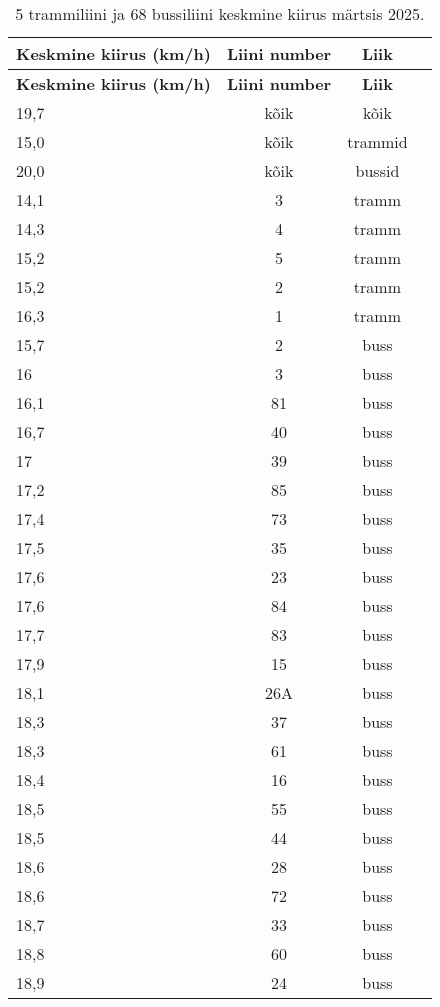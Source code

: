 


\begin{longtable}{|l|c|c|c|}
\caption{5 trammiliini ja  68 bussiliini keskmine kiirus märtsis 2025. }
\label{tab:keskmisedMartsis}\\ \hline
 \textbf{Keskmine kiirus (km/h)}  & \textbf{Liini number}  & \textbf{Liik} \\
\hline
\endfirsthead
\hline
\textbf{Keskmine kiirus (km/h)} & 
\textbf{Liini number} & \textbf{Liik} \\
\hline
\endhead
19,7 & kõik & kõik\\ \hline
15,0 & kõik & trammid\\ \hline
20,0 & kõik & bussid\\ \hline
14,1	&	3	&	tramm	\\ \hline
14,3	&	4	&	tramm	\\ \hline 
15,2	&	5	&	tramm	\\ \hline
15,2	&	2	&	tramm	\\ \hline
16,3	&	1	&	tramm	\\ \hline
15,7	&	2	&	buss	\\ \hline
16	&	3	&	buss	\\ \hline
16,1	&	81	&	buss	\\ \hline
16,7	&	40	&	buss	\\ \hline
17	&	39	&	buss	\\ \hline
17,2	&	85	&	buss	\\ \hline
17,4	&	73	&	buss	\\ \hline
17,5	&	35	&	buss	\\ \hline
17,6	&	23	&	buss	\\ \hline
17,6	&	84	&	buss	\\ \hline
17,7	&	83	&	buss	\\ \hline
17,9	&	15	&	buss	\\ \hline
18,1	&	26A	&	buss	\\ \hline
18,3	&	37	&	buss	\\ \hline
18,3	&	61	&	buss	\\ \hline
18,4	&	16	&	buss	\\ \hline
18,5	&	55	&	buss	\\ \hline
18,5	&	44	&	buss	\\ \hline
18,6	&	28	&	buss	\\ \hline
18,6	&	72	&	buss	\\ \hline
18,7	&	33	&	buss	\\ \hline
18,8	&	60	&	buss	\\ \hline
18,9	&	24	&	buss	\\ \hline

\end{longtable}
